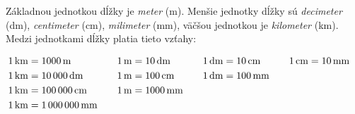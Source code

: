 \documentclass{article}
\begin{document}
Základnou jednotkou dĺžky je \emph{meter} (m). Menšie jednotky dĺžky sú \emph{decimeter} (dm), \emph{centimeter} (cm), \emph{milimeter} (mm), väčšou jednotkou je \emph{kilometer} (km). Medzi jednotkami dĺžky platia tieto vzťahy:

\vspace{1em}\noindent
\[
\begin{array}{@{}c@{\qquad}c@{\qquad}c@{\qquad}c@{}}
\begin{aligned}[t]
  \SI{1}{\km} &= \SI{1\,000}{\m} \\
  \SI{1}{\km} &= \SI{10\,000}{\dm} \\
  \SI{1}{\km} &= \SI{100\,000}{\cm} \\
  \SI{1}{\km} &= \SI{1\,000\,000}{\mm}
\end{aligned}
&
\begin{aligned}[t]
  \SI{1}{\m} &= \SI{10}{\dm} \\
  \SI{1}{\m} &= \SI{100}{\cm} \\
  \SI{1}{\m} &= \SI{1\,000}{\mm}
\end{aligned}
&
\begin{aligned}[t]
  \SI{1}{\dm} &= \SI{10}{\cm} \\
  \SI{1}{\dm} &= \SI{100}{\mm}
\end{aligned}
&
\begin{aligned}[t]
  \SI{1}{\cm} &= \SI{10}{\mm}
\end{aligned}
\end{array}
\]
\end{document}
